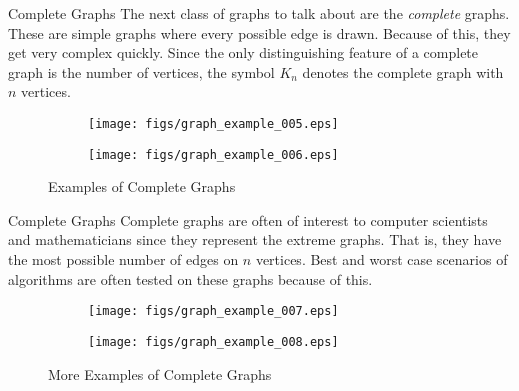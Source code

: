 \documentclass{beamer}
\begin{document}
    \begin{frame}{Complete Graphs}
        The next class of graphs to talk about are the \textit{complete} graphs. These are
        simple graphs where every possible edge is drawn. Because of this, they get very complex
        quickly. Since the only distinguishing feature of a complete graph is the number of
        vertices, the symbol $K_{n}$ denotes the complete graph with $n$ vertices.
        \begin{figure}
            \centering
            \begin{subfigure}[b]{0.49\textwidth}
                \centering
                \texttt{[image: figs/graph\_example\_005.eps]}
                \label{fig:graph_example_005}
            \end{subfigure}
            \begin{subfigure}[b]{0.49\textwidth}
                \centering
                \texttt{[image: figs/graph\_example\_006.eps]}
                \label{fig:graph_example_006}
            \end{subfigure}
            \caption{Examples of Complete Graphs}
            \label{fig:complex_complete_graphs_001}
        \end{figure}
    \end{frame}
    \begin{frame}{Complete Graphs}
        Complete graphs are often of interest to computer scientists and
        mathematicians since they represent the extreme graphs.
        That is, they have the most possible number of edges on $n$ vertices.
        Best and worst case scenarios of algorithms are often tested on
        these graphs because of this.
        \begin{figure}
            \centering
            \begin{subfigure}[b]{0.49\textwidth}
                \centering
                \texttt{[image: figs/graph\_example\_007.eps]}
                \label{fig:graph_example_007}
            \end{subfigure}
            \begin{subfigure}[b]{0.49\textwidth}
                \centering
                \texttt{[image: figs/graph\_example\_008.eps]}
                \label{fig:graph_example_008}
            \end{subfigure}
            \caption{More Examples of Complete Graphs}
            \label{fig:complex_complete_graphs_002}
        \end{figure}
    \end{frame}
\end{document}
